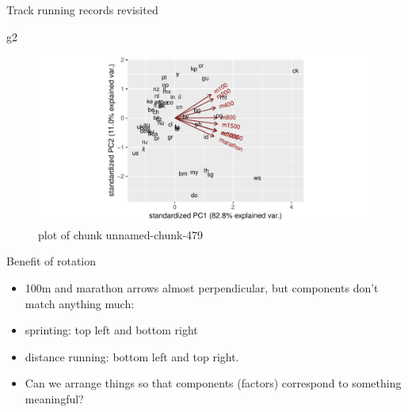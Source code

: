 \documentclass[ignorenonframetext,]{beamer}
\newenvironment{Shaded}{\begin{snugshade}}{\end{snugshade}}
\newcommand{\NormalTok}[1]{#1}
\begin{document}
\begin{frame}[fragile]{Track running records revisited}
\protect\hypertarget{track-running-records-revisited}{}

\begin{Shaded}
\begin{Highlighting}[]
\NormalTok{g2}
\end{Highlighting}
\end{Shaded}

\begin{figure}
\centering
\includegraphics{figure/unnamed-chunk-479-1.pdf}
\caption{plot of chunk unnamed-chunk-479}
\end{figure}

\end{frame}

\begin{frame}{Benefit of rotation}
\protect\hypertarget{benefit-of-rotation}{}

\begin{itemize}
\item
  100m and marathon arrows almost perpendicular, but components don't
  match anything much:
\item
  sprinting: top left and bottom right
\item
  distance running: bottom left and top right.
\item
  Can we arrange things so that components (factors) correspond to
  something meaningful?
\end{itemize}

\end{frame}
\end{document}
